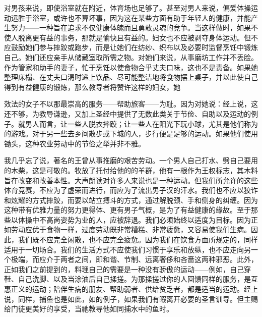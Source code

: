 对男孩来说，即使浴室就在附近，体育场也足够了。甚至对男人来说，偏爱体操运动远胜于浴室，或许也不算坏事，因为这在某些方面有助于年轻人的健康，并能产生努力——一种旨在追求不仅健康体魄而且勇敢灵魂的竞争。当这样做时，如果不使人脱离更有益的事务，那就是愉快且有益的。妇女也不应被剥夺身体运动。但不应鼓励她们参与摔跤或跑步，而是让她们在纺纱、织布以及必要时监督烹饪中锻炼自己。她们还应亲手从储藏室取所需之物。对她们来说，从事磨坊工作并不丢脸。作为管家和助手的妻子，忙于烹饪以使食物合乎丈夫口味，这也不是责备。如果她整理床榻、在丈夫口渴时递上饮品、尽可能整洁地将食物摆上桌子，并以此使自己得到有益健康的锻炼，那么教导者将赞许这样的妇女，她\par

效法的女子不以那最崇高的服务——帮助旅客——为耻。因为对她说：经上说，这还不够，为教导谦逊，又加上圣经中提供了无数此类关于节俭、自助以及运动的例子。就男人而言，让一些人脱衣摔跤；让一些人在阳光下玩小球，尤其是他们称为的游戏。对于另一些去乡间散步或下城的人，步行便是足够的运动。如果他们使用锄头，这种农业劳动中的节俭之举并非不雅。\par

我几乎忘了说，著名的王曾从事推磨的艰苦劳动。一个男人自己打水、劈自己要用的木柴，这是可敬的。牧放了托付给他的的羊群，他有一根作为王权标志，其木料旨在改变和改善本性。大声朗读对许多人来说也是一种运动。但我们所允许的这些体育竞赛，不应为了虚荣而进行，而应为了流出男子汉的汗水。我们也不应以狡诈和炫耀的方式摔跤，而要以站立搏斗的方式，通过解脱颈、手和侧身的纠缠。因为这种带有优雅力量的努力更得体、更有男子气概，是为了有益健康的缘故。至于那些以体操中不高尚姿势为业的人，应被辞退。我们必须始终以适度为目标。因为正如劳动应优于食物一样，过度劳动既非常糟糕、非常疲惫，又容易使我们生病。因此，我们既不应完全闲散，也不应完全疲惫。因为我们在饮食方面所规定的，同样适用于一切场合。我们的生活方式不应使我们习惯于享乐和放纵，也不应走向另一个极端，而应介于两者之间，即和谐、节制、远离奢侈和吝啬这两种邪恶。此外，正如我们之前提到的，料理自己的需要是一种没有骄傲的运动——例如，自己穿鞋、自己洗脚、以及当涂油后自己揉搓。为那揉搓过你的人回馈同样的服务，是互惠正义的运动；陪伴生病的朋友、帮助弱者、供给贫乏者，都是适当的运动。经上说，同样，捕鱼也是如此，如的例子，如果我们有暇离开必要的圣言训导。但主赐给门徒更美好的享受，当祂教导他如同捕水中的鱼时。\par

